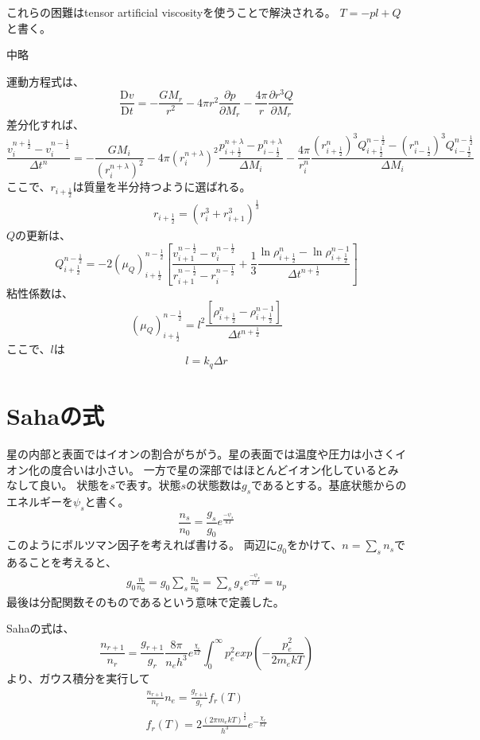 \documentclass{jsarticle}
\newcommand{\pder}[2][]{\frac{\partial#1}{\partial#2}}
\newcommand{\Dder}[2][]{\frac{\mathrm{D}#1}{\mathrm{D}#2}}
\newcommand{\half}{\frac{1}{2}}
\newcommand{\hpn}{n + \half}
\newcommand{\hmn}{n - \half}
\newcommand{\hpi}{i + \half}
\newcommand{\beq}{\begin{equation}}
\newcommand{\eeq}{\end{equation}}
\begin{document}
これらの困難はtensor artificial viscosityを使うことで解決される。
$T = - pl + Q$と書く。　

中略

運動方程式は、
\beq
    \Dder[v]{t} = - \frac{GM_r}{r^2} - 4\pi r^2\pder[p]{M_r} - \frac{4\pi}{r}\pder[r^3Q]{M_r}
\eeq
差分化すれば、
\beq
    \frac{v^{n+\half}_i - v^{n-\half}_i}{\Delta t^n} =
    -\frac{GM_i}{(r^{n+\lambda}_i)^2}
    -4\pi(r^{n+\lambda}_i)^2
    \frac{p^{n+\lambda}_{i+\half} - p^{n+\lambda}_{i-\half}}{\Delta M_i}
    -\frac{4\pi}{r^{n}_i}
    \frac{(r^{n}_{i+\half})^3Q^{n-\half}_{i+\half} - (r^{n}_{i-\half})^3Q^{n-\half}_{i-\half}}{\Delta M_i}
\eeq
ここで、$r_{i+\half}$は質量を半分持つように選ばれる。
\begin{align}
    r_{i+\half} = (r^3_i + r^3_{i+1})^{\frac{1}{3}}
\end{align}
$Q$の更新は、
\beq
    Q^{\hmn}_{\hpi} = - 2 (\mu_Q)^{\hmn}_{\hpi}
     \left[\frac{v^{\hmn}_{i+1}-v^{\hmn}_{i}}{r^{\hmn}_{i+1}-r^{\hmn}_{i}}
      +\frac{1}{3}\frac{\ln \rho^{n}_{\hpi} - \ln \rho^{n-1}_{\hpi}}{\Delta t^{\hpn}}\right]
\eeq
粘性係数は、
\beq
    (\mu_Q)^{n-\half}_{i+\half} = 
    l^2 \frac{\left[ \rho^n_{\hpi} - \rho^{n-1}_{\hpi}\right]}{\Delta t^{\hpn}}
\eeq
ここで、$l$は
\beq
    l = k_q \Delta r
\eeq
\section{Sahaの式}
星の内部と表面ではイオンの割合がちがう。星の表面では温度や圧力は小さくイオン化の度合いは小さい。
一方で星の深部ではほとんどイオン化しているとみなして良い。
状態を$s$で表す。状態$s$の状態数は$g_s$であるとする。基底状態からのエネルギーを$\psi_s$と書く。
\begin{equation}
    \frac{n_s}{n_0} = \frac{g_s}{g_0} e^{\frac{-\psi_s}{kT}}
\end{equation}
このようにボルツマン因子を考えれば書ける。
両辺に$g_0$をかけて、$n=\sum_sn_s$であることを考えると、
\begin{align}
       g_0 \frac{n}{n_0} = g_0 \sum_s\frac{n_s}{n_0} =\sum_s g_s e^{\frac{-\psi_s}{kT}} = u_p
\end{align}
最後は分配関数そのものであるという意味で定義した。

Sahaの式は、
\begin{equation}
    \frac{n_{r+1}}{n_{r}} = \frac{g_{r+1}}{g_{r}} \frac{8\pi}{n_eh^3} 
    e^{\frac{\chi_r}{kT}}
    \int^{\infty}_{0} p_e^2 exp(-\frac{p^2_e}{2m_e kT})
\end{equation}
より、ガウス積分を実行して
\begin{align}
    \frac{n_{r+1}}{n_{r}} n_e =\frac{g_{r+1}}{g_{r}} f_r(T)\\
    f_r(T) = 2 \frac{(2\pi m_e kT)^{\frac{3}{2}}}{h^3}e^{-\frac{\chi_r}{kT}}
\end{align}
\end{document}
